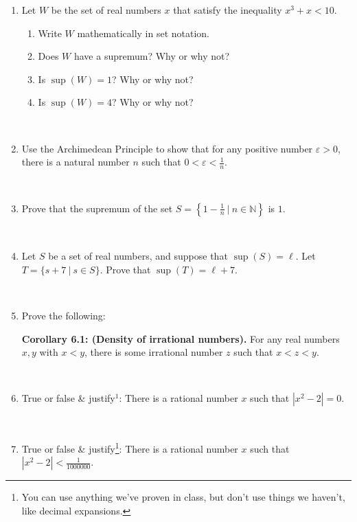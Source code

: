 \documentclass[12pt]{amsart}
\newcommand{\N}{\mathbb{N}}
\newcommand{\e}{\varepsilon}
\newcommand{\ds}{\displaystyle}
\begin{document}
\begin{enumerate}
\item Let $W$ be the set of real numbers $x$ that satisfy the inequality $x^3+x<10$.
\begin{enumerate}
\item Write $W$ mathematically in set notation.
\item Does $W$ have a supremum? Why or why not?
\item Is $\sup(W)=1$?  Why or why not?
\item Is $\sup(W)=4$?  Why or why not?
\end{enumerate}

\

\item Use the Archimedean Principle to show that for any positive number $\e>0$, there is a natural number $n$ such that $\ds 0 < \e < \frac{1}{n}$.

\

\item Prove that the supremum of the set $\ds S= \left\{ 1 - \frac1n \ | \ n\in \N\right\}$ is $1$.

\

\item Let $S$ be a set of real numbers, and suppose that $\sup(S)=\ell$. Let $T=\{s+7 \ | \ s\in S\}$. Prove that $\sup(T) = \ell + 7$.

\

\item Prove the following:
\begin{framed}
\noindent \textbf{Corollary 6.1: (Density of irrational numbers).} For any real numbers $x,y$ with $x<y$, there is some irrational number $z$ such that $x<z<y$.
\end{framed}
\

\item True or false \& justify$^{\text{1}}$: There is a rational number $x$ such that $|x^2 - 2| = 0$.

\

\item True or false \& justify\footnote{You can use anything we've proven in class, but don't use things we haven't, like decimal expansions.}: There is a rational number $x$ such that $|x^2 - 2| < \frac{1}{1000000}$.


\end{enumerate}
\end{document}
